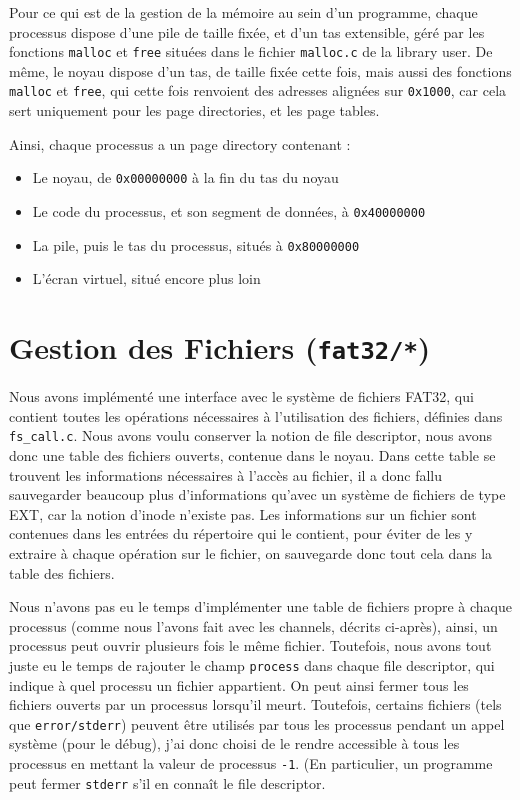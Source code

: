 \documentclass[a4paper,10pt, french]{article}
\newcommand{\code}[1]{\texttt{#1}}
\begin{document}
Pour ce qui est de la gestion de la mémoire au sein d'un programme, chaque processus dispose d'une pile de taille fixée, et d'un tas extensible,
géré par les fonctions \code{malloc} et \code{free} situées dans le fichier \code{malloc.c} de la library user.
De même, le noyau dispose d'un tas, de taille fixée cette fois, mais aussi des fonctions \code{malloc} et \code{free},
qui cette fois renvoient des adresses alignées sur \code{0x1000}, car cela sert uniquement pour les page directories, et les page tables.

Ainsi, chaque processus a un page directory contenant : 
\begin{itemize}
 \item Le noyau, de \code{0x00000000} à la fin du tas du noyau
 \item Le code du processus, et son segment de données, à \code{0x40000000}
 \item La pile, puis le tas du processus, situés à \code{0x80000000}
 \item L'écran virtuel, situé encore plus loin
\end{itemize}

\section{Gestion des Fichiers (\code{fat32/*})}
Nous avons implémenté une interface avec le système de fichiers FAT32, qui contient toutes les opérations
nécessaires à l'utilisation des fichiers, définies dans \code{fs\_call.c}.
Nous avons voulu conserver la notion de file descriptor, nous avons donc une table des fichiers ouverts, contenue 
dans le noyau. Dans cette table se trouvent les informations nécessaires à l'accès au fichier, il a donc fallu sauvegarder beaucoup 
plus d'informations qu'avec un système de fichiers de type EXT, car la notion d'inode n'existe pas.
Les informations sur un fichier sont contenues dans les entrées du répertoire qui le contient, pour éviter de les y
extraire à chaque opération sur le fichier, on sauvegarde donc tout cela dans la table des fichiers.

Nous n'avons pas eu le temps d'implémenter une table de fichiers propre à chaque processus (comme nous l'avons fait avec les
channels, décrits ci-après), ainsi, un processus peut ouvrir plusieurs fois le même fichier. Toutefois, nous avons tout juste eu le temps
de rajouter le champ \code{process} dans chaque file descriptor, qui indique à quel processu un fichier 
appartient. On peut ainsi fermer tous les fichiers ouverts par un processus lorsqu'il meurt. Toutefois,
certains fichiers (tels que \code{error/stderr}) peuvent être utilisés par tous les processus pendant un appel
système (pour le débug), j'ai donc choisi de le rendre accessible à tous les processus en mettant la 
valeur de processus \code{-1}. (En particulier, un programme peut fermer \code{stderr} s'il en connaît 
le file descriptor.
\end{document}
